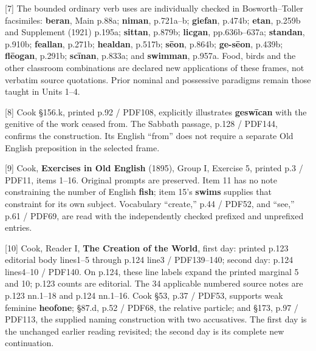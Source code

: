 [7] The bounded ordinary verb uses are individually checked in Bosworth–Toller facsimiles: \textbf{beran}, Main p.88a; \textbf{niman}, p.721a–b; \textbf{giefan}, p.474b; \textbf{etan}, p.259b and Supplement (1921) p.195a; \textbf{sittan}, p.879b; \textbf{licgan}, pp.636b–637a; \textbf{standan}, p.910b; \textbf{feallan}, p.271b; \textbf{healdan}, p.517b; \textbf{sēon}, p.864b; \textbf{ge-sēon}, p.439b; \textbf{flēogan}, p.291b; \textbf{scīnan}, p.833a; and \textbf{swimman}, p.957a. Food, birds and the other classroom combinations are declared new applications of these frames, not verbatim source quotations. Prior nominal and possessive paradigms remain those taught in Units 1–4.

[8] Cook §156.k, printed p.92 /\allowbreak{} PDF108, explicitly illustrates \textbf{geswīcan} with the genitive of the work ceased from. The Sabbath passage, p.128 /\allowbreak{} PDF144, confirms the construction. Its English “from” does not require a separate Old English preposition in the selected frame.

[9] Cook, \textbf{Exercises in Old English} (1895), Group I, Exercise 5, printed p.3 /\allowbreak{} PDF11, items 1–16. Original prompts are preserved. Item 11 has no note constraining the number of English \textbf{fish}; item 15's \textbf{swims} supplies that constraint for its own subject. Vocabulary “create,” p.44 /\allowbreak{} PDF52, and “see,” p.61 /\allowbreak{} PDF69, are read with the independently checked prefixed and unprefixed entries.

[10] Cook, Reader I, \textbf{The Creation of the World}, first day: printed p.123 editorial body lines1–5 through p.124 line3 /\allowbreak{} PDF139–140; second day: p.124 lines4–10 /\allowbreak{} PDF140. On p.124, these line labels expand the printed marginal 5 and 10; p.123 counts are editorial. The 34 applicable numbered source notes are p.123 nn.1–18 and p.124 nn.1–16. Cook §53, p.37 /\allowbreak{} PDF53, supports weak feminine \textbf{heofone}; §87.d, p.52 /\allowbreak{} PDF68, the relative particle; and §173, p.97 /\allowbreak{} PDF113, the supplied naming construction with two accusatives. The first day is the unchanged earlier reading revisited; the second day is its complete new continuation.

\endgroup

\par\label{end-ch05-key}
\clearpage\endgroup
